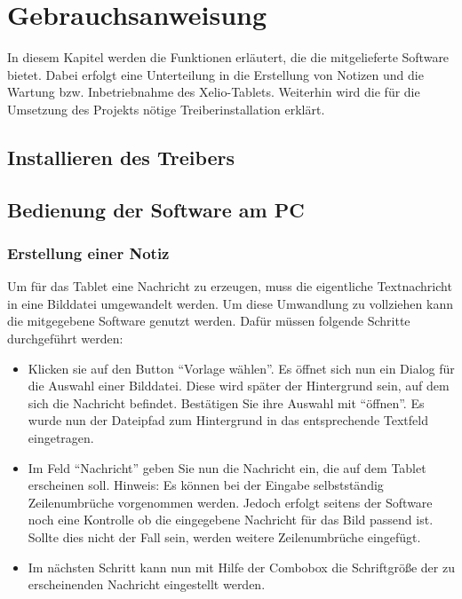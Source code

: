 \chapter{Gebrauchsanweisung}
\vspace*{-3cm}
\begin{flushleft}
In diesem Kapitel werden die Funktionen erläutert, die die mitgelieferte Software bietet. Dabei erfolgt eine Unterteilung in die Erstellung von Notizen und die Wartung bzw. Inbetriebnahme des Xelio-Tablets. Weiterhin wird die für die Umsetzung des Projekts nötige Treiberinstallation erklärt. 

\section{Installieren des Treibers}

\section{Bedienung der Software am PC}
\subsection{Erstellung einer Notiz}
Um für das Tablet eine Nachricht zu erzeugen, muss die eigentliche Textnachricht in eine Bilddatei umgewandelt werden. Um diese Umwandlung zu vollziehen kann die mitgegebene Software genutzt werden. Dafür müssen folgende Schritte durchgeführt werden:
\begin{itemize}
  \item Klicken sie auf den Button ``Vorlage wählen''.
    \subitem Es öffnet sich nun ein Dialog für die Auswahl einer Bilddatei. Diese wird später der Hintergrund sein, auf dem sich die 			 Nachricht befindet. Bestätigen Sie ihre Auswahl mit ``öffnen''.
    \subitem Es wurde nun der Dateipfad zum Hintergrund in das entsprechende Textfeld eingetragen. 
    
  \item Im Feld ``Nachricht'' geben Sie nun die Nachricht ein, die auf dem Tablet erscheinen soll. 
    \subitem Hinweis: Es können bei der Eingabe selbstständig Zeilenumbrüche vorgenommen werden. Jedoch erfolgt seitens der Software noch 	  	 eine Kontrolle ob die eingegebene Nachricht für das Bild passend ist. Sollte dies nicht der Fall sein, werden weitere 	
	     Zeilenumbrüche eingefügt.  
	     
  \item Im nächsten Schritt kann nun mit Hilfe der Combobox die Schriftgröße der zu erscheinenden Nachricht eingestellt werden. 
  

\end{itemize}
\end{flushleft}
